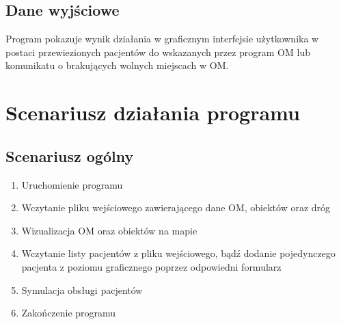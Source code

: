 \documentclass[]{article}
\begin{document}
    \subsection{Dane wyjściowe} %
    Program pokazuje wynik działania w graficznym interfejsie użytkownika w postaci przewiezionych pacjentów do wskazanych przez program OM lub komunikatu o brakujących wolnych miejscach w OM.


    \section{Scenariusz działania programu}

    \subsection{Scenariusz ogólny} %
    \begin{enumerate}
        \item Uruchomienie programu
        \item Wczytanie pliku wejściowego zawierającego dane OM, obiektów oraz dróg
        \item Wizualizacja OM oraz obiektów na mapie
        \item Wczytanie listy pacjentów z pliku wejściowego, bądź dodanie pojedynczego pacjenta z poziomu graficznego poprzez odpowiedni formularz
        \item Symulacja obsługi pacjentów
        \item Zakończenie programu
    \end{enumerate}
\end{document}
